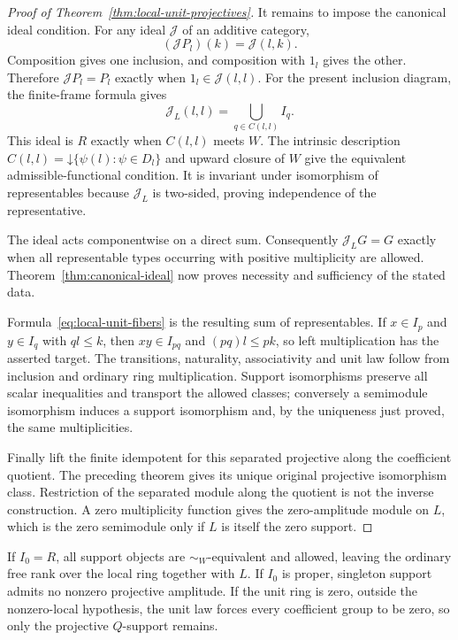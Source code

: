 \begin{proof}[Proof of Theorem~\ref{thm:local-unit-projectives}]
It remains to impose the canonical ideal condition. For any ideal
$\mathcal J$ of an additive category,
\[
 (\mathcal J P_l)(k)=\mathcal J(l,k).
\]
Composition gives one inclusion, and composition with $1_l$ gives the
other. Therefore $\mathcal J P_l=P_l$ exactly when
$1_l\in\mathcal J(l,l)$. For the present inclusion diagram, the
finite-frame formula gives
\[
 \mathcal J_L(l,l)=\bigcup_{q\in C(l,l)}I_q.
\]
This ideal is $R$ exactly when $C(l,l)$ meets $W$. The intrinsic
description $C(l,l)=\mathord\downarrow\{\psi(l):\psi\in D_l\}$ and
upward closure of $W$ give the equivalent admissible-functional
condition. It is invariant under isomorphism of representables because
$\mathcal J_L$ is two-sided, proving independence of the representative.

The ideal acts componentwise on a direct sum. Consequently
$\mathcal J_LG=G$ exactly when all representable types occurring with
positive multiplicity are allowed. Theorem~\ref{thm:canonical-ideal}
now proves necessity and sufficiency of the stated data.

Formula~\eqref{eq:local-unit-fibers} is the resulting sum of
representables. If $x\in I_p$ and $y\in I_q$ with $ql\leq k$, then
$xy\in I_{pq}$ and $(pq)l\leq pk$, so left multiplication has the
asserted target. The transitions, naturality, associativity and unit
law follow from inclusion and ordinary ring multiplication. Support
isomorphisms preserve all scalar inequalities and transport the
allowed classes; conversely a semimodule isomorphism induces a support
isomorphism and, by the uniqueness just proved, the same multiplicities.

Finally lift the finite idempotent for this separated projective along
the coefficient quotient. The preceding theorem gives its unique
original projective isomorphism class. Restriction of the separated
module along the quotient is not the inverse construction. A zero
multiplicity function gives the zero-amplitude module on $L$, which
is the zero semimodule only if $L$ is itself the zero support.
\end{proof}

If $I_0=R$, all support objects are $\sim_W$-equivalent and allowed,
leaving the ordinary free rank over the local ring together with $L$.
If $I_0$ is proper, singleton support admits no nonzero projective
amplitude. If the unit ring is zero, outside the nonzero-local
hypothesis, the unit law forces every coefficient group to be zero,
so only the projective $Q$-support remains.
